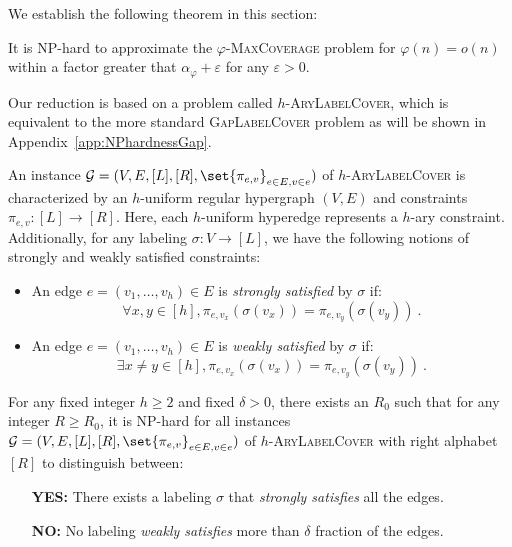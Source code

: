 We establish the following theorem in this section:

\begin{theorem}
 It is \textrm{NP}-hard to approximate the $\varphi$-\textsc{MaxCoverage} problem for $\varphi(n) = o(n)$ within a factor greater that $\alpha_{\varphi} + \varepsilon$ for any $\varepsilon > 0$.
  \label{theo:Hardness}
\end{theorem}

Our reduction is based on a problem called $h$-\textsc{AryLabelCover}, which is equivalent to the more standard \textsc{GapLabelCover} problem as will be shown in Appendix~\ref{app:NPhardnessGap}.
\begin{definition}
  An instance $\mathcal{G} = (V,E,[L],[R],\set{\pi_{e,v}}_{e \in E, v \in e})$ of $h$-\textsc{AryLabelCover} is characterized by an $h$-uniform regular hypergraph $(V, E)$ and constraints $\pi_{e,v} : [L] \rightarrow [R]$. Here, each $h$-uniform hyperedge represents a $h$-ary constraint. Additionally, for any labeling $\sigma : V \rightarrow [L]$, we have the following notions of strongly and weakly satisfied constraints:
  \begin{itemize}
  \item An edge $e = (v_1,\ldots,v_h) \in E$ is \emph{strongly satisfied} by $\sigma$ if:
    \[ \forall x,y \in [h], \pi_{e,v_x}(\sigma(v_x)) = \pi_{e,v_y}(\sigma(v_y))\ . \]
  \item An edge $e = (v_1,\ldots,v_h) \in E$ is \emph{weakly satisfied} by $\sigma$ if:
    \[ \exists x\not=y \in [h], \pi_{e,v_x}(\sigma(v_x)) = \pi_{e,v_y}(\sigma(v_y))\ . \]
  \end{itemize}
\end{definition}

\begin{proposition}
\label{prop:hardness-ary-lc}
  For any fixed integer $h \geq 2$ and fixed $\delta > 0$, there exists an $R_0$ such that for any integer $R \geq R_0$, it is \textrm{NP}-hard for all instances ${\mathcal{G} = (V,E,[L],[R],\set{\pi_{e,v}}_{e \in E, v \in e})}$ of $h$-\textsc{AryLabelCover} with right alphabet $[R]$ to distinguish between: 
  \begin{itemize}
  \item[\textbf{YES:}] There exists a labeling $\sigma$ that \emph{strongly satisfies} all the edges.
  \item[\textbf{NO:}] No labeling \emph{weakly satisfies} more than $\delta$ fraction of the edges.
  \end{itemize}
  \label{prop:AryGapLabelCover}
\end{proposition}


